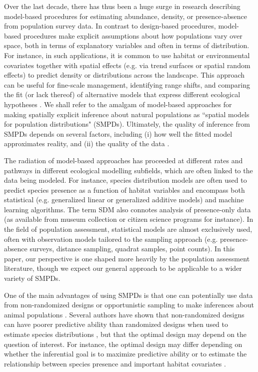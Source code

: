 \documentclass[times,mee,doublespace,]{besauth2}
\begin{document}
Over the last decade, there has thus been a huge surge in research describing model-based procedures for estimating abundance, density, or presence-absence from population survey data.  In contrast to design-based procedures, model-based procedures make explicit assumptions about how populations vary over space, both in terms of explanatory variables and often in terms of distribution.  For instance, in such applications, it is common to use habitat or environmental covariates together with spatial effects (e.g. via trend surfaces or spatial random effects) to predict density or distributions across the landscape. This approach can be useful for fine-scale management, identifying range shifts, and comparing the fit (or lack thereof) of alternative models that express different ecological hypotheses \citep{Austin2007}.  We shall refer to the amalgam of model-based approaches for making spatially explicit inference about natural populations as ``spatial models for population distributions" (SMPDs).  Ultimately, the quality of inference from SMPDs depends on several factors, including (i) how well the fitted model approximates reality, and (ii) the quality of the data \citep{BucklandEtAl2000}.  

The radiation of model-based approaches has proceeded at different rates and pathways in different ecological modelling subfields, which are often linked to the data being modeled.  For instance, species distribution models \citep[SDMs; ][]{ElithLeathwick2009} are often used to predict species presence as a function of habitat variables and encompass both statistical (e.g. generalized linear or generalized additive models) and machine learning algorithms. The term SDM also connotes analysis of presence-only data (as available from museum collection or citizen science programs for instance).  In the field of population assessment, statistical models are almost exclusively used, often with observation models tailored to the sampling approach (e.g. presence-absence surveys, distance sampling, quadrat samples, point counts).  In this paper, our perspective is one shaped more heavily by the population assessment literature, though we expect our general approach to be applicable to a wider variety of SMPDs.

One of the main advantages of using SMPDs is that one can potentially use data from non-randomized designs or opportunistic sampling to make inferences about animal populations \citep{JohnsonEtAl2010}. Several authors have shown that non-randomized designs can have poorer predictive ability than randomized designs when used to estimate species distributions \citep[e.g.][]{EdwardsEtAl2006,AlbertEtAl2010}, but that the optimal design may depend on the question of interest.  For instance, the optimal design may differ depending on whether the inferential goal is to maximize predictive ability or to estimate the relationship between species presence and important habitat covariates \citep{AlbertEtAl2010}.
\end{document}
